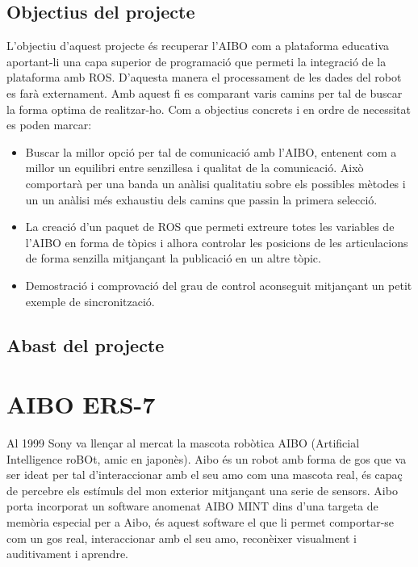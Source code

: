 \documentclass[12pt,a4paper,final,twoside]{article}
\begin{document}
\subsection{Objectius del projecte}
L'objectiu d'aquest projecte és recuperar l'AIBO com a plataforma educativa aportant-li una capa superior de programació que permeti la integració de la plataforma amb ROS. D'aquesta manera el processament de les dades del robot es farà externament. Amb aquest fi es comparant varis camins per tal de buscar la forma optima de realitzar-ho. Com a objectius concrets i en ordre de necessitat es poden marcar:
\begin{itemize}
\item Buscar la millor opció per tal de comunicació amb l'AIBO, entenent com a millor un equilibri entre senzillesa i qualitat de la comunicació. Això comportarà per una banda un anàlisi qualitatiu sobre els possibles mètodes i un un anàlisi més exhaustiu dels camins que passin la primera selecció. 
\item La creació d'un paquet de ROS que permeti extreure totes les variables de l'AIBO en forma de tòpics i alhora controlar les posicions de les articulacions de forma senzilla mitjançant la publicació en un altre tòpic. 

\item Demostració i comprovació del grau de control aconseguit mitjançant un petit exemple de sincronització.
\end{itemize}


\subsection{Abast del projecte}


\section{AIBO ERS-7}\label{secaibo}
Al 1999 Sony va llençar al mercat la mascota robòtica AIBO (Artificial Intelligence roBOt, amic en japonès). Aibo és un robot amb forma de gos que va ser ideat per tal d'interaccionar amb el seu amo com una mascota real, és capaç de percebre els estímuls del mon exterior mitjançant una serie de sensors. Aibo porta incorporat un software anomenat AIBO MINT dins d'una targeta de memòria especial per a Aibo, és aquest software el que li permet comportar-se com un gos real, interaccionar amb el seu amo, reconèixer visualment i auditivament i aprendre.
\end{document}
